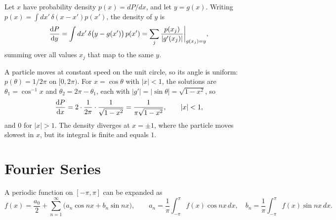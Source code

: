 Let $x$ have probability density $p(x) = dP/dx$, and let $y = g(x)$. Writing $p(x) = \int dx'\,\delta(x-x')p(x')$, the density of $y$ is
\[
    \dv{P}{y} = \int dx'\,\delta\bigl(y - g(x')\bigr)\,p(x') = \sum_j\frac{p(x_j)}{|g'(x_j)|}\bigg|_{g(x_j)=y},
\]
summing over all values $x_j$ that map to the same $y$.

\begin{example}
A particle moves at constant speed on the unit circle, so its angle is uniform: $p(\theta) = 1/2\pi$ on $[0,2\pi)$. For $x = \cos\theta$ with $|x|<1$, the solutions are $\theta_1 = \cos^{-1}x$ and $\theta_2 = 2\pi - \theta_1$, each with $|g'| = |\sin\theta| = \sqrt{1-x^2}$, so
\[
    \dv{P}{x} = 2\cdot\frac{1}{2\pi}\cdot\frac{1}{\sqrt{1-x^2}} = \frac{1}{\pi\sqrt{1-x^2}},\qquad |x|<1,
\]
and $0$ for $|x|>1$. The density diverges at $x = \pm1$, where the particle moves slowest in $x$, but its integral is finite and equals $1$.
\end{example}

\section{Fourier Series}

A periodic function on $[-\pi,\pi]$ can be expanded as
\[
    f(x) = \frac{a_0}{2} + \sum_{n=1}^\infty\bigl(a_n\cos nx + b_n\sin nx\bigr),
    \qquad
    a_n = \frac1\pi\int_{-\pi}^{\pi}f(x)\cos nx\,dx,\quad b_n = \frac1\pi\int_{-\pi}^{\pi}f(x)\sin nx\,dx .
\]
